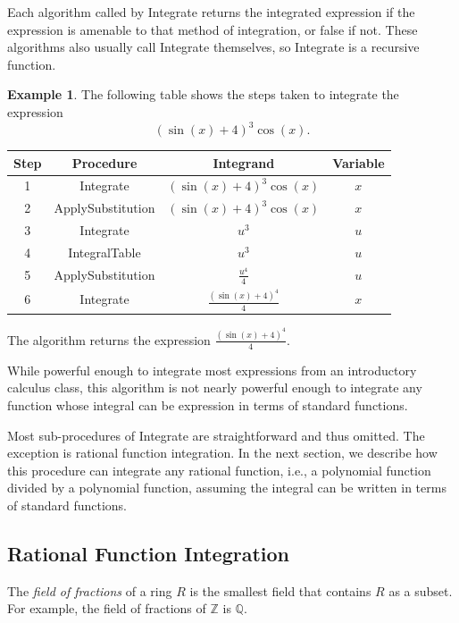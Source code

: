\documentclass{article}
\theoremstyle{definition}
\newtheorem{exa}[thm]{Example}
\begin{document}
Each algorithm called by Integrate returns the integrated expression if the expression is amenable to that method of integration, or false if not. These algorithms also usually call Integrate themselves, so Integrate is a recursive function.

\begin{exa}
    The following table shows the steps taken to integrate the expression \[(\sin(x)+4)^3\cos(x).\]
    \begingroup
    \renewcommand*{\arraystretch}{2}
    \begin{center}
        \begin{tabular}{|c|c|c|c|}
            \hline
             Step&Procedure&Integrand&Variable\\
             \hline
     1&Integrate&$(\sin(x)+4)^3\cos(x)$&$x$\\
     2&ApplySubstitution&$(\sin(x)+4)^3\cos(x)$&$x$\\
     3&Integrate&$u^3$&$u$\\
     4&IntegralTable&$u^3$&$u$\\
     5&ApplySubstitution&$\frac{u^4}{4}$&$u$\\
     6&Integrate&$\frac{(\sin(x)+4)^4}{4}$& $x$\\
     \hline
        \end{tabular}
    \end{center}
    \endgroup
    
    The algorithm returns the expression $\frac{(\sin(x)+4)^4}{4}$.
\end{exa}

While powerful enough to integrate most expressions from an introductory calculus class, this algorithm is not nearly powerful enough to integrate any function whose integral can be expression in terms of standard functions.

Most sub-procedures of Integrate are straightforward and thus omitted. The exception is rational function integration. In the next section, we describe how this procedure can integrate any rational function, i.e., a polynomial function divided by a polynomial function, assuming the integral can be written in terms of standard functions.

\subsection{Rational Function Integration}

The \emph{field of fractions} of a ring $R$ is the smallest field that contains $R$ as a subset. For example, the field of fractions of $\mathbb{Z}$ is $\mathbb{Q}$.
\end{document}
